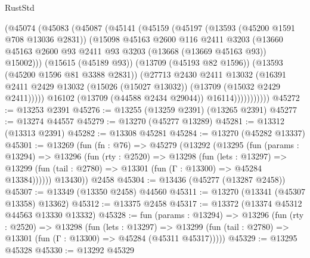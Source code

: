 \begin{lexlean}{RustStd}
\begin{coremodule}
                  (@45074
                    (@45083
                      (@45087
                        (@45141
                          (@45159
                            (@45197
                              (@13593 (@45200 @1591 @708 @13036 @2831))
                              (@15098
                                @45163
                                @2600
                                @116
                                @2411
                                @3203
                                (@13660
                                  @45163
                                  @2600
                                  @93
                                  @2411
                                  @93
                                  @3203
                                  (@13668 (@13669 @45163 @93))
                                  @15002)))
                            (@15615 (@45189 @93))
                            (@13709 (@45193 @82 @1596))
                            (@13593 (@45200 @1596 @81 @3388 @2831))
                            (@27713
                              @2430
                              @2411
                              @13032
                              (@16391
                                @2411
                                @2429
                                @13032
                                (@15026 (@15027 @13032))
                                (@13709 (@15032 @2429 @2411)))))
                          @16102
                          (@13709 (@44588 @2434 @29044))
                          @16114)))))))))))
@45272 := @13253 @2391
@45276 := @13255 (@13259 @2391) (@13265 @2391)
@45277 := @13274 @44557
@45279 := @13270 (@45277 @13289)
@45281 := @13312 (@13313 @2391)
@45282 := @13308 @45281
@45284 := @13270 (@45282 @13337)
@45301 := @13269
    (fun (fn : @76) =>
    @45279
      (@13292
        (@13295
          (fun (params : @13294) =>
          @13296
            (fun (rty : @2520) =>
            @13298
              (fun (lets : @13297) =>
              @13299 (fun (tail : @2780) => @13301 (fun (Γ : @13300) => @45284 @13384))))))
        @13430))
    @2458
@45304 := @13436 (@45277 (@13287 @2458))
@45307 := @13349 (@13350 @2458) @44560
@45311 := @13270 (@13341 (@45307 @13358) @13362)
@45312 := @13375 @2458
@45317 := @13372 (@13374 @45312 @44563 @13330 @13332)
@45328 := fun (params : @13294) =>
  @13296
    (fun (rty : @2520) =>
    @13298
      (fun (lets : @13297) =>
      @13299 (fun (tail : @2780) => @13301 (fun (Γ : @13300) => @45284 (@45311 @45317)))))
@45329 := @13295 @45328
@45330 := @13292 @45329

\end{coremodule}
\end{lexlean}
